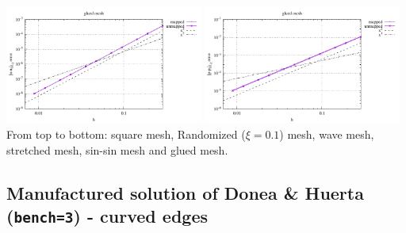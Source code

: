 \begin{center}
\includegraphics[width=6.5cm]{python_codes/fieldstone_76/results/bench3/straight/errors_V_mt6.pdf}
\includegraphics[width=6.5cm]{python_codes/fieldstone_76/results/bench3/straight/errors_P_mt6.pdf}\\
{\captionfont From top to bottom: square mesh, Randomized ($\xi=0.1$) mesh,
wave mesh, stretched mesh, sin-sin mesh and glued mesh.}
\end{center}

\newpage
\subsection*{Manufactured solution of Donea \& Huerta ({\tt bench=3}) - curved edges}


